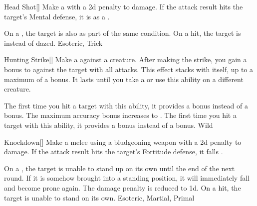 \lowercase{\hypertarget{maneuver:Head Shot}{}}\label{maneuver:Head Shot}
\hypertarget{maneuver:Head Shot}{}
\begin{freeability}[Rank 3]{Head Shot}[]
Make a  with a \minus2d penalty to damage.
If the attack result hits the target's Mental defense,
it is  as a .

\rankline
{} On a , the target is also  as part of the same condition.
 On a hit, the target is  instead of dazed.
 Esoteric, Trick
\end{freeability}
\vspace{0.25em}



\lowercase{\hypertarget{maneuver:Hunting Strike}{}}\label{maneuver:Hunting Strike}
\hypertarget{maneuver:Hunting Strike}{}
\begin{freeability}[Rank 1]{Hunting Strike}[]
Make a  against a creature.
After making the strike, you gain a  bonus to  against the target with all attacks.
This effect stacks with itself, up to a maximum of a  bonus.
It lasts until you take a  or use this ability on a different creature.

\rankline
{} The first time you hit a target with this ability, it provides a  bonus instead of a  bonus.
 The maximum accuracy bonus increases to .
 The first time you hit a target with this ability, it provides a  bonus instead of a  bonus.
 Wild
\end{freeability}
\vspace{0.25em}



\lowercase{\hypertarget{maneuver:Knockdown}{}}\label{maneuver:Knockdown}
\hypertarget{maneuver:Knockdown}{}
\begin{freeability}[Rank 1]{Knockdown}[]
Make a melee  using a bludgeoning weapon with a \minus2d penalty to damage.
If the attack result hits the target's Fortitude defense,
it falls .

\rankline
{} On a , the target is unable to stand up on its own until the end of the next round.
If it is somehow brought into a standing position, it will immediately fall and become prone again.
 The damage penalty is reduced to \minus1d.
 On a hit, the target is unable to stand on its own.
 Esoteric, Martial, Primal
\end{freeability}
\vspace{0.25em}



